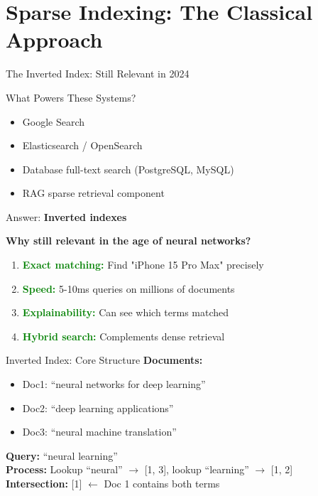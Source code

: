 \documentclass[aspectratio=169]{beamer}
\begin{document}
\section{Sparse Indexing: The Classical Approach}

\begin{frame}{The Inverted Index: Still Relevant in 2024}
\begin{block}{What Powers These Systems?}
\begin{itemize}
    \item Google Search
    \item Elasticsearch / OpenSearch
    \item Database full-text search (PostgreSQL, MySQL)
    \item RAG sparse retrieval component
\end{itemize}
Answer: \textbf{Inverted indexes}
\end{block}

\vspace{1em}

\textbf{Why still relevant in the age of neural networks?}
\begin{enumerate}
    \item \textcolor{green}{\textbf{Exact matching:}} Find "iPhone 15 Pro Max" precisely
    \item \textcolor{green}{\textbf{Speed:}} 5-10ms queries on millions of documents
    \item \textcolor{green}{\textbf{Explainability:}} Can see which terms matched
    \item \textcolor{green}{\textbf{Hybrid search:}} Complements dense retrieval
\end{enumerate}
\end{frame}

\begin{frame}[shrink=15]{Inverted Index: Core Structure}
\textbf{Documents:}
\begin{itemize}
    \item Doc1: ``neural networks for deep learning''
    \item Doc2: ``deep learning applications''
    \item Doc3: ``neural machine translation''
\end{itemize}

\vspace{1em}

\begin{center}

\end{center}

\vspace{1em}

\textbf{Query:} ``neural learning'' \\
\textbf{Process:} Lookup ``neural'' $\rightarrow$ [1, 3], lookup ``learning'' $\rightarrow$ [1, 2] \\
\textbf{Intersection:} [1] $\leftarrow$ Doc 1 contains both terms
\end{frame}
\end{document}

